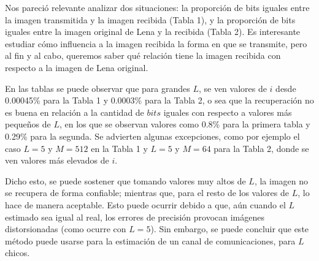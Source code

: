 \documentclass[10pt,journal,compsoc]{IEEEtran}
\begin{document}
Nos pareci\'o relevante analizar dos situaciones: la proporci\'on de bits iguales entre la imagen transmitida y la imagen recibida (Tabla 1), y la proporci\'on de bits iguales entre la imagen original de Lena y la recibida (Tabla 2).  Es interesante estudiar c\'omo influencia a la imagen recibida la forma en que se transmite, pero al fin y al cabo, queremos saber qu\'e relaci\'on tiene la imagen recibida con respecto a la imagen de Lena original. 

En las tablas se puede observar que para grandes $L$, se ven valores de $i$ desde 0.00045\% para la Tabla 1 y 0.0003\% para la Tabla 2, o sea que la recuperaci\'on no es buena en relaci\'on a la cantidad de $bits$ iguales con respecto a valores m\'as peque\~nos de $L$, en los que se observan valores como 0.8\% para la primera tabla y 0.29\% para la segunda. Se advierten algunas excepciones, como por ejemplo el caso $L = 5$ y $M = 512$ en la Tabla 1 y $L = 5$ y $M = 64$ para la Tabla 2, donde se ven valores m\'as elevados de $i$. 

Dicho esto, se puede sostener que tomando valores muy altos de $L$, la imagen no se recupera de forma confiable; mientras que, para el resto de los valores de $L$, lo hace de manera aceptable. Esto puede ocurrir debido a que, a\'un cuando el $L$ estimado sea igual al real, los errores de precisi\'on provocan im\'agenes distorsionadas (como ocurre con $L=5$).  Sin embargo, se puede concluir que este m\'etodo puede usarse para la estimaci\'on de un canal de comunicaciones, para $L$ chicos. \\ 








\end{document}
